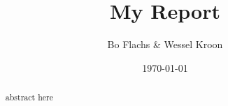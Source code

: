 \documentclass[12pt,a4paper]{article}
\title{My Report}
\author{Bo Flachs \& Wessel Kroon}
\date{\today}
\begin{document}
\maketitle

\begin{abstract}
abstract here
\end{abstract}

\tableofcontents

\clearpage























\end{document}
